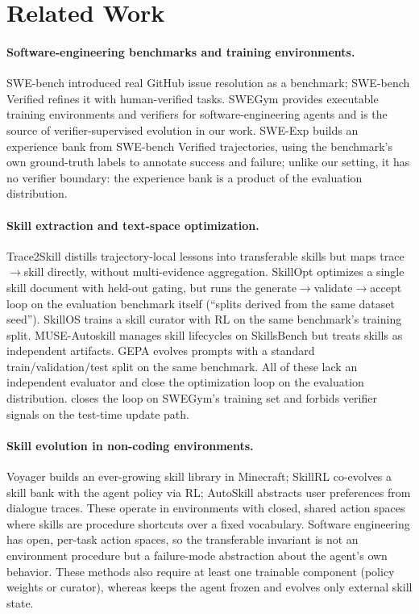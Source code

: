 \section{Related Work}

\paragraph{Software-engineering benchmarks and training environments.}
SWE-bench \citep{swebench2024} introduced real GitHub issue resolution as a
benchmark; SWE-bench Verified \citep{swebenchverified2024} refines it with
human-verified tasks. SWEGym \citep{swegym2025} provides executable training
environments and verifiers for software-engineering agents and is the source of
verifier-supervised evolution in our work. SWE-Exp \citep{sweexp2025} builds
an experience bank from SWE-bench Verified trajectories, using the benchmark's
own ground-truth labels to annotate success and failure; unlike our setting, it
has no verifier boundary: the experience bank is a product of the evaluation
distribution.

\paragraph{Skill extraction and text-space optimization.}
Trace2Skill \citep{trace2skill2024} distills trajectory-local lessons into
transferable skills but maps trace$\to$skill directly, without multi-evidence
aggregation. SkillOpt \citep{skillopt2024} optimizes a single skill document
with held-out gating, but runs the generate$\to$validate$\to$accept loop on
the evaluation benchmark itself (``splits derived from the same dataset
seed''). SkillOS \citep{skillos2025} trains a skill curator with RL on the
same benchmark's training split. MUSE-Autoskill \citep{museautoskill2026}
manages skill lifecycles on SkillsBench but treats skills as independent
artifacts. GEPA \citep{gepa2026} evolves prompts with a standard
train/validation/test split on the same benchmark. All of these lack an
independent evaluator and close the optimization loop on the evaluation
distribution. \method{} closes the loop on SWEGym's training set and forbids
verifier signals on the test-time update path.

\paragraph{Skill evolution in non-coding environments.}
Voyager \citep{voyager2023} builds an ever-growing skill library in Minecraft;
SkillRL \citep{skillrl2026} co-evolves a skill bank with the agent policy via
RL; AutoSkill \citep{autoskill2023} abstracts user preferences from dialogue
traces. These operate in environments with closed, shared action spaces where
skills are procedure shortcuts over a fixed vocabulary. Software engineering
has open, per-task action spaces, so the transferable invariant is not an
environment procedure but a failure-mode abstraction about the agent's own
behavior. These methods also require at least one trainable component
(policy weights or curator), whereas \method{} keeps the agent frozen and
evolves only external skill state.

